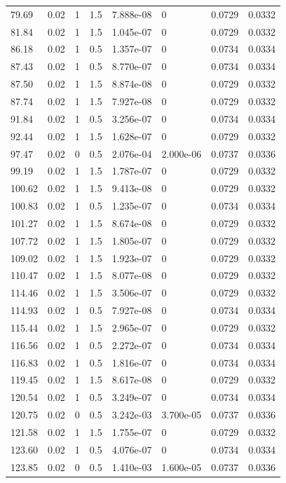 \documentclass[preview]{standalone}
\begin{document}
{{\begin{tabular}{L{1.2cm}C{1.2cm} C{0.3cm}C{0.5cm} C{1.4cm}C{1.4cm} C{1.4cm}C{1.4cm}}
  79.69  &  0.02  & 1     & 1.5 &  7.888e-08  & 0  & 0.0729 &  0.0332   \\ 
  81.84  &  0.02  & 1     & 1.5 &  1.045e-07  & 0  & 0.0729 &  0.0332   \\ 
  86.18  &  0.02  & 1     & 0.5 &  1.357e-07  & 0  & 0.0734 &  0.0334   \\ 
  87.43  &  0.02  & 1     & 0.5 &  8.770e-07  & 0  & 0.0734 &  0.0334   \\ 
  87.50  &  0.02  & 1     & 1.5 &  8.874e-08  & 0  & 0.0729 &  0.0332   \\ 
  87.74  &  0.02  & 1     & 1.5 &  7.927e-08  & 0  & 0.0729 &  0.0332   \\ 
  91.84  &  0.02  & 1     & 0.5 &  3.256e-07  & 0  & 0.0734 &  0.0334   \\ 
  92.44  &  0.02  & 1     & 1.5 &  1.628e-07  & 0  & 0.0729 &  0.0332   \\ 
  97.47  &  0.02  & 0     & 0.5 &  2.076e-04  & 2.000e-06  & 0.0737 &  0.0336   \\ 
  99.19  &  0.02  & 1     & 1.5 &  1.787e-07  & 0  & 0.0729 &  0.0332   \\ 
  100.62  &  0.02  & 1     & 1.5 &  9.413e-08  & 0  & 0.0729 &  0.0332   \\ 
  100.83  &  0.02  & 1     & 0.5 &  1.235e-07  & 0  & 0.0734 &  0.0334   \\ 
  101.27  &  0.02  & 1     & 1.5 &  8.674e-08  & 0  & 0.0729 &  0.0332   \\ 
  107.72  &  0.02  & 1     & 1.5 &  1.805e-07  & 0  & 0.0729 &  0.0332   \\ 
  109.02  &  0.02  & 1     & 1.5 &  1.923e-07  & 0  & 0.0729 &  0.0332   \\ 
  110.47  &  0.02  & 1     & 1.5 &  8.077e-08  & 0  & 0.0729 &  0.0332   \\ 
  114.46  &  0.02  & 1     & 1.5 &  3.506e-07  & 0  & 0.0729 &  0.0332   \\ 
  114.93  &  0.02  & 1     & 0.5 &  7.927e-08  & 0  & 0.0734 &  0.0334   \\ 
  115.44  &  0.02  & 1     & 1.5 &  2.965e-07  & 0  & 0.0729 &  0.0332   \\ 
  116.56  &  0.02  & 1     & 0.5 &  2.272e-07  & 0  & 0.0734 &  0.0334   \\ 
  116.83  &  0.02  & 1     & 0.5 &  1.816e-07  & 0  & 0.0734 &  0.0334   \\ 
  119.45  &  0.02  & 1     & 1.5 &  8.617e-08  & 0  & 0.0729 &  0.0332   \\ 
  120.54  &  0.02  & 1     & 0.5 &  3.249e-07  & 0  & 0.0734 &  0.0334   \\ 
  120.75  &  0.02  & 0     & 0.5 &  3.242e-03  & 3.700e-05  & 0.0737 &  0.0336   \\ 
  121.58  &  0.02  & 1     & 1.5 &  1.755e-07  & 0  & 0.0729 &  0.0332   \\ 
  123.60  &  0.02  & 1     & 0.5 &  4.076e-07  & 0  & 0.0734 &  0.0334   \\ 
  123.85  &  0.02  & 0     & 0.5 &  1.410e-03  & 1.600e-05  & 0.0737 &  0.0336   \\ 
\hline 
\end{tabular} 

}}
\end{document}
